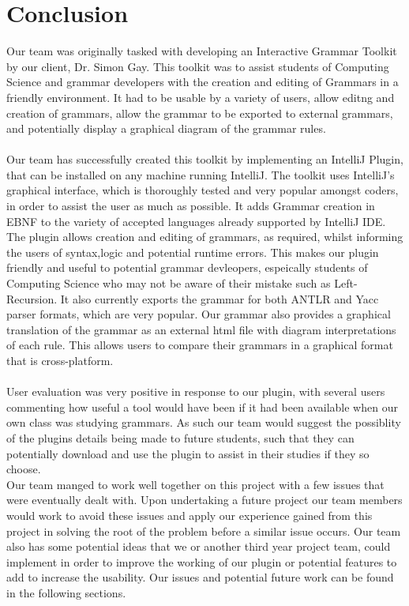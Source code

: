 \chapter{Conclusion}
\label{conclusion}

Our team was originally tasked with developing an Interactive Grammar Toolkit by our client, Dr. Simon Gay. This toolkit was to assist students of Computing Science and grammar developers with the creation and editing of Grammars in a friendly environment. It had to be usable by a variety of users, allow editng and creation of grammars, allow the grammar to be exported to external grammars, and potentially display a graphical diagram of the grammar rules.\\
\\
Our team has successfully created this toolkit by implementing an IntelliJ Plugin, that can be installed on any machine running IntelliJ. The toolkit uses IntelliJ's graphical interface, which is thoroughly tested and very popular amongst coders, in order to assist the user as much as possible. It adds Grammar creation in EBNF to the variety of accepted languages already supported by IntelliJ IDE. The plugin allows creation and editing of grammars, as required, whilst informing the users of syntax,logic and potential runtime errors. This makes our plugin friendly and useful to potential grammar devleopers, espeically students of Computing Science who may not be aware of their mistake such as Left-Recursion. It also currently exports the grammar for both ANTLR and Yacc parser formats, which are very popular. Our grammar also provides a graphical translation of the grammar as an external html file with diagram interpretations of each rule. This allows users to compare their grammars in a graphical format that is cross-platform.\\
\\
User evaluation was very positive in response to our plugin, with several users commenting how useful a tool would have been if it had been available when our own class was studying grammars. As such our team would suggest the possiblity of the plugins details being made to future students, such that they can potentially download and use the plugin to assist in their studies if they so choose.
\\
Our team manged to work well together on this project with a few issues that were eventually dealt with. Upon undertaking a future project our team members would work to avoid these issues and apply our experience gained from this project in solving the root of the problem before a similar issue occurs. Our team also has some potential ideas that we or another third year project team, could implement in order to improve the working of our plugin or potential features to add to increase the usability. Our issues and potential future work can be found in the following sections. 


